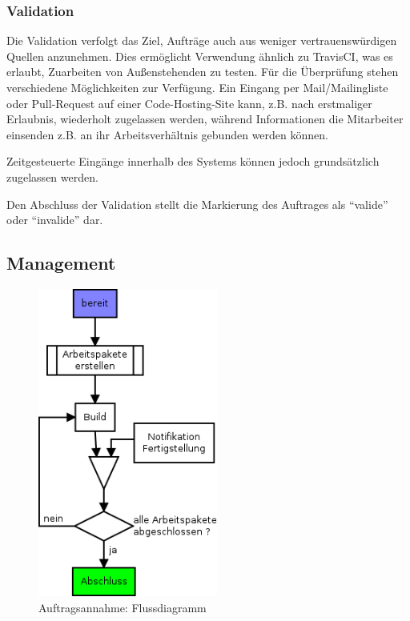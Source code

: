 \subsubsection{Validation}


Die Validation verfolgt das Ziel, Aufträge auch aus weniger vertrauenswürdigen Quellen anzunehmen.
Dies ermöglicht Verwendung ähnlich zu TravisCI, was es erlaubt, Zuarbeiten von Außenstehenden zu testen.
Für die Überprüfung stehen verschiedene Möglichkeiten zur Verfügung.
Ein Eingang per Mail/Mailingliste oder Pull-Request auf einer Code-Hosting-Site kann,
z.B. nach erstmaliger Erlaubnis, wiederholt zugelassen werden,
während Informationen die Mitarbeiter einsenden z.B. an ihr Arbeitsverhältnis gebunden werden können.

Zeitgesteuerte Eingänge innerhalb des Systems können jedoch grundsätzlich zugelassen werden.

Den Abschluss der Validation stellt die Markierung des Auftrages als ``valide'' oder ``invalide'' dar.

\subsection{Management}

\begin{figure}[ht] 
  \centering
  \includegraphics[height=4in]{imageinput/lebenszyklus-auftrag-abarbeitung.png}
  \caption{Auftragsannahme: Flussdiagramm}
  \label{fig:lebenszyklus-auftrag-abarbeitung}
\end{figure}

